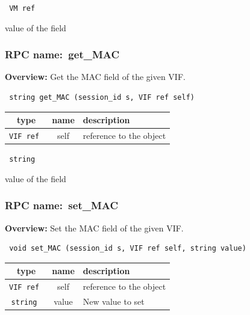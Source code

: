 \vspace{0.3cm}

{\tt 
VM ref
}


value of the field
\vspace{0.3cm}
\vspace{0.3cm}
\vspace{0.3cm}
\subsubsection{RPC name:~get\_MAC}

{\bf Overview:} 
Get the MAC field of the given VIF.

\begin{verbatim} string get_MAC (session_id s, VIF ref self)\end{verbatim}



 
\vspace{0.3cm}
\begin{tabular}{|c|c|p{7cm}|}
 \hline
{\bf type} & {\bf name} & {\bf description} \\ \hline
{\tt VIF ref } & self & reference to the object \\ \hline 

\end{tabular}

\vspace{0.3cm}

{\tt 
string
}


value of the field
\vspace{0.3cm}
\vspace{0.3cm}
\vspace{0.3cm}
\subsubsection{RPC name:~set\_MAC}

{\bf Overview:} 
Set the MAC field of the given VIF.

\begin{verbatim} void set_MAC (session_id s, VIF ref self, string value)\end{verbatim}



 
\vspace{0.3cm}
\begin{tabular}{|c|c|p{7cm}|}
 \hline
{\bf type} & {\bf name} & {\bf description} \\ \hline
{\tt VIF ref } & self & reference to the object \\ \hline 

{\tt string } & value & New value to set \\ \hline 

\end{tabular}

